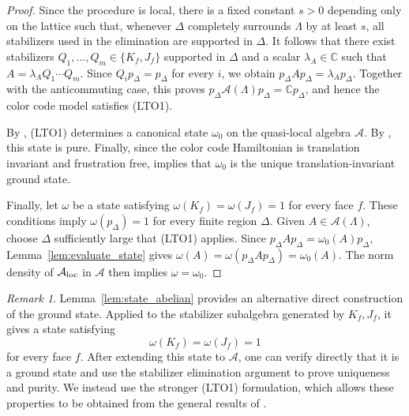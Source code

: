 \documentclass[a4paper,11pt]{article}
\theoremstyle{definition}
\theoremstyle{remark}
\newtheorem{remark}{Remark}[section]
\theoremstyle{remark}
\begin{document}
\begin{proof}
Since the procedure is local, there is a fixed constant $s>0$ depending only on the lattice such that, whenever $\Delta$ completely surrounds $\Lambda$ by at least $s$, all stabilizers used in the elimination are supported in $\Delta$. It follows that there exist stabilizers $Q_1,\ldots,Q_m\in\{K_f,J_f\}$ supported in $\Delta$ and a scalar
$\lambda_A\in\mathbb C$ such that $A=\lambda_A Q_1\cdots Q_m$. Since $Q_i p_\Delta=p_\Delta$ for every $i$, we obtain $p_\Delta A p_\Delta = \lambda_A p_\Delta$. Together with the anticommuting case, this proves $p_\Delta\mathcal A(\Lambda)p_\Delta = \mathbb{C} p_\Delta$, and hence the color code model satisfies {\rm (LTO1)}.

By \cite[Corollary 2.19, Definition~2.20]{jones2025local}, {\rm (LTO1)} determines a canonical state $\omega_0$ on the quasi-local algebra $\mathcal A$. By \cite[Corollary~2.24]{jones2025local}, this state is pure. Finally, since the color code Hamiltonian is translation invariant and frustration free, \cite[Remark~2.25]{jones2025local} implies that $\omega_0$ is the unique translation-invariant ground state.

Finally, let $\omega$ be a state satisfying $\omega(K_f)=\omega(J_f)=1$ for every face $f$. These conditions imply $\omega(p_\Delta)=1$ for every finite region $\Delta$. Given $A\in\mathcal A(\Lambda)$, choose $\Delta$ sufficiently large that {\rm (LTO1)} applies. Since $p_\Delta A p_\Delta=\omega_0(A)p_\Delta$, Lemma~\ref{lem:evaluate_state} gives $\omega(A)=\omega(p_\Delta A p_\Delta)=\omega_0(A)$. The norm density of $\mathcal A_{\rm loc}$ in $\mathcal A$ then implies $\omega=\omega_0$.
\end{proof}

\begin{remark}
    Lemma~\ref{lem:state_abelian} provides an alternative direct construction of the ground state. Applied to the stabilizer subalgebra generated by $K_f, J_f$, it gives a state satisfying
    \[
        \omega(K_f)=\omega(J_f)=1
    \]
    for every face $f$. After extending this state to $\mathcal A$, one can verify directly that it is a ground state and use the stabilizer elimination argument to prove uniqueness and purity. We instead use the stronger {\rm (LTO1)} formulation, which allows these properties to be obtained from the general results of \cite{jones2025local}.
\end{remark}
\end{document}
